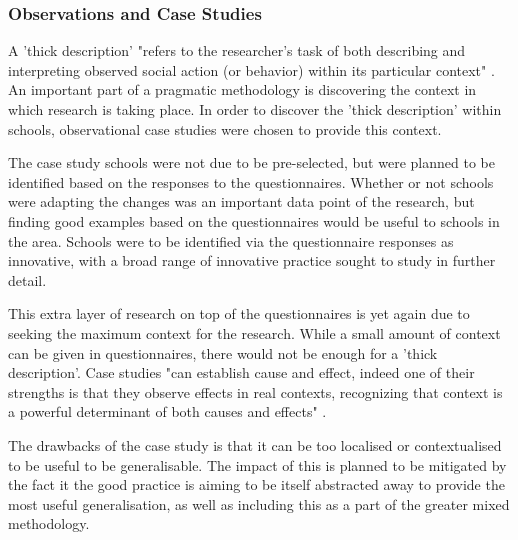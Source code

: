 \subsubsection{Observations and Case Studies}

A 'thick description' "refers to the researcher’s task of both describing and interpreting observed social action (or behavior) within its particular context" \cite[p. 543]{thickdescription}. An important part of a pragmatic methodology is discovering the context in which research is taking place. In order to discover the 'thick description' within schools, observational case studies were chosen to provide this context.

The case study schools were not due to be pre-selected, but were planned to be identified based on the responses to the questionnaires. Whether or not schools were adapting the changes was an important data point of the research, but finding good examples based on the questionnaires would be useful to schools in the area. Schools were to be identified via the questionnaire responses as innovative, with a broad range of innovative practice sought to study in further detail.

This extra layer of research on top of the questionnaires is yet again due to seeking the maximum context for the research. While a small amount of context can be given in questionnaires, there would not be enough for a 'thick description'. Case studies "can establish cause and effect, indeed one of their strengths is that they observe effects in real contexts, recognizing that context is a powerful determinant of both causes and effects" \cite[p. 181]{Cohen2005}.

The drawbacks of the case study is that it can be too localised or contextualised to be useful to be generalisable. The impact of this is planned to be mitigated by the fact it the good practice is aiming to be itself abstracted away to provide the most useful generalisation, as well as including this as a part of the greater mixed methodology.
